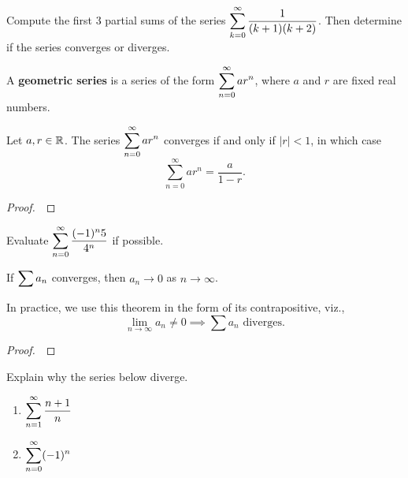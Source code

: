 \newpage

\begin{example}
Compute the first 3 partial sums of the series $\displaystyle\sum_{k=0}^\infty \frac{1}{(k+1)(k+2)}$.
Then determine if the series converges or diverges.
\end{example}

\newpage

\begin{definition}
A \textbf{geometric series} is a series of the form $\displaystyle\sum_{n=0}^\infty ar^n$, where $a$ and $r$ are fixed real numbers.
\end{definition}

\begin{theorem}
Let $a,r\in\mathbb R$.
The series $\displaystyle\sum_{n=0}^\infty ar^n$ converges if and only if $|r|<1$, in which case
\begin{equation*}
\sum_{n=0}^\infty ar^n = \frac{a}{1-r}.
\end{equation*}
\end{theorem}
\begin{proof}\,

\vspace{6in}
\end{proof}

\newpage 

\begin{example}
Evaluate $\displaystyle\sum_{n=0}^\infty\frac{(-1)^n5}{4^n}$ if possible.
\end{example}

\newpage

\begin{theorem}
If $\displaystyle\sum a_n$ converges, then $a_n\to 0$ as $n\to\infty$.
\end{theorem}
\begin{remark}
In practice, we use this theorem in the form of its contrapositive, viz.,
\begin{equation*}
\lim_{n\to\infty} a_n\ne 0 \implies \sum a_n \text{ diverges}.
\end{equation*}
\end{remark}
\begin{proof}\,

\vspace{3in}
\end{proof}
\begin{example}
Explain why the series below diverge.
\begin{enumerate}
\item $\displaystyle\sum_{n=1}^\infty \frac{n+1}{n}$
\vfill
\item $\displaystyle\sum_{n=0}^\infty (-1)^n$
\vfill
\end{enumerate}
\end{example}

